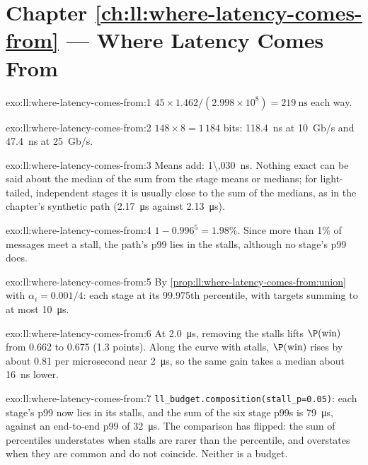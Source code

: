 \section*{Chapter \ref{ch:ll:where-latency-comes-from} --- Where Latency Comes From}

\begin{solution}{exo:ll:where-latency-comes-from:1}
$45 \times 1.462 / (2.998\times10^8) = \qty{219}{\nano\second}$ each way.
\end{solution}

\begin{solution}{exo:ll:where-latency-comes-from:2}
$148 \times 8 = 1\,184$ bits: \qty{118.4}{\nano\second} at 10~Gb/s and \qty{47.4}{\nano\second} at 25~Gb/s.
\end{solution}

\begin{solution}{exo:ll:where-latency-comes-from:3}
Means add: \qty{1\,030}{\nano\second}. Nothing exact can be said about the median of the sum from the stage means or
medians; for light-tailed, independent stages it is usually close to the sum of the medians, as in the chapter's
synthetic path (\qty{2.17}{\micro\second} against \qty{2.13}{\micro\second}).
\end{solution}

\begin{solution}{exo:ll:where-latency-comes-from:4}
$1 - 0.996^5 = 1.98\%$. Since more than 1\% of messages meet a stall, the path's p99 lies in the stalls, although no
stage's p99 does.
\end{solution}

\begin{solution}{exo:ll:where-latency-comes-from:5}
By \cref{prop:ll:where-latency-comes-from:union} with $\alpha_i = 0.001/4$: each stage at its 99.975th percentile, with
targets summing to at most \qty{10}{\micro\second}.
\end{solution}

\begin{solution}{exo:ll:where-latency-comes-from:6}
At \qty{2.0}{\micro\second}, removing the stalls lifts $\P(\text{win})$ from 0.662 to 0.675 (1.3 points). Along the
curve with stalls, $\P(\text{win})$ rises by about 0.81 per microsecond near \qty{2}{\micro\second}, so the same gain
takes a median about \qty{16}{\nano\second} lower.
\end{solution}

\begin{solution}{exo:ll:where-latency-comes-from:7}
\texttt{ll\_budget.composition(stall\_p=0.05)}: each stage's p99 now lies in its stalls, and the sum of the six stage
p99s is \qty{79}{\micro\second}, against an end-to-end p99 of \qty{32}{\micro\second}. The comparison has flipped: the
sum of percentiles understates when stalls are rarer than the percentile, and overstates when they are common and do
not coincide. Neither is a budget.
\end{solution}

